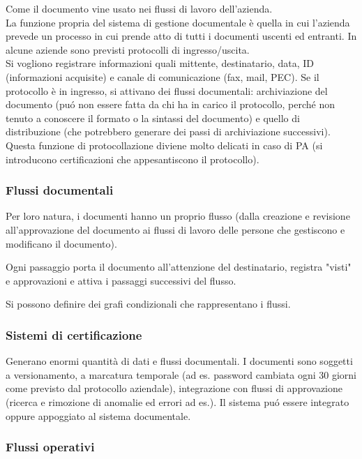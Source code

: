 Come il documento vine usato nei flussi di lavoro dell'azienda.\\
La funzione propria del sistema di gestione documentale \`e quella in cui
l'azienda prevede un processo in cui prende atto di tutti i documenti
uscenti ed entranti. In alcune aziende sono previsti protocolli di 
ingresso/uscita.\\

Si vogliono registrare informazioni quali mittente, destinatario, data, ID 
(informazioni acquisite) e canale di comunicazione (fax, mail, PEC). 
Se il protocollo \`e in ingresso, si attivano dei flussi documentali: 
archiviazione del documento (pu\'o non essere fatta da chi ha in carico il 
protocollo, perch\'e non tenuto a conoscere il formato o la sintassi del 
documento) e quello di distribuzione (che potrebbero generare dei passi di 
archiviazione successivi).\\
Questa funzione di protocollazione diviene molto delicati in caso di PA
(si introducono certificazioni che appesantiscono il protocollo).

\subsubsection{Flussi documentali}

Per loro natura, i documenti hanno un proprio flusso (dalla creazione e
revisione all'approvazione del documento ai flussi di lavoro delle
persone che gestiscono e modificano il documento).

Ogni passaggio porta il documento all'attenzione del destinatario, registra 
"visti" e approvazioni e attiva i passaggi successivi del flusso.

Si possono definire dei grafi condizionali che rappresentano i flussi.

\subsubsection{Sistemi di
certificazione}

Generano enormi quantit\`a di dati e flussi documentali. I documenti sono 
soggetti a versionamento, a marcatura temporale (ad es. password cambiata ogni 
30 giorni come previsto dal protocollo aziendale), integrazione con flussi di
approvazione (ricerca e rimozione di anomalie ed errori ad es.). Il
sistema pu\'o essere integrato oppure appoggiato al sistema documentale.

\subsubsection{Flussi operativi}

